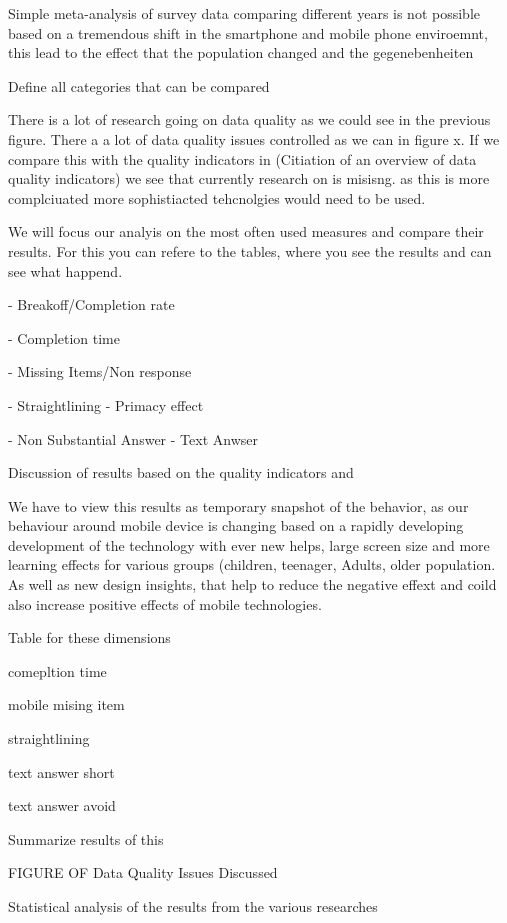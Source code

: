Simple meta-analysis of survey data comparing different years is not possible based on a tremendous shift in the smartphone and mobile phone enviroemnt, this lead to the effect that the population changed and the gegenebenheiten

Define all categories that can be compared

There is a lot of research going on data quality as we could see in the previous figure. There a a lot of data quality issues controlled as we can in figure x. If we compare this with the quality indicators in (Citiation of an overview of data quality indicators) we see that currently research on is misisng. as this is more complciuated more sophistiacted tehcnolgies would need to be used. 



We will focus our analyis on the most often used measures and compare their results. For this you can refere to the tables, where you see the results and can see what happend.


- Breakoff/Completion rate

- Completion time 

- Missing Items/Non response

- Straightlining
- Primacy effect

- Non Substantial Answer
- Text Anwser

Discussion of results based on the quality indicators and 

We have to view this results as temporary snapshot of the behavior, as our behaviour around mobile device is changing based on a rapidly developing development of the technology with ever new helps, large screen size and more learning effects for various groups (children, teenager, Adults, older population. As well as new design insights, that help to reduce the negative effext and coild also increase positive effects of mobile technologies.

Table for these dimensions

comepltion time

mobile mising item

straightlining

text answer short

text answer avoid

Summarize results of this 

FIGURE OF Data Quality Issues Discussed


Statistical analysis of the results from the various researches


